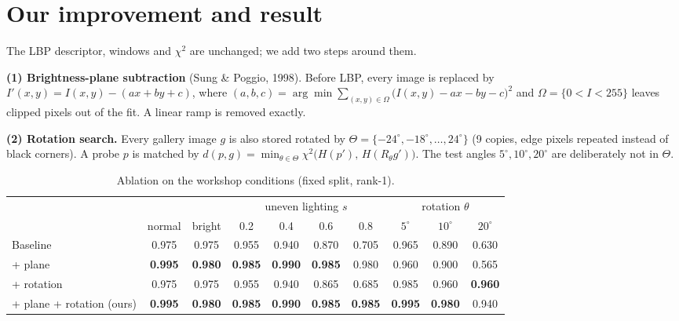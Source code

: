 \documentclass{article}
\begin{document}
\section{Our improvement and result}

The LBP descriptor, windows and $\chi^2$ are unchanged; we add two steps around them.

\textbf{(1) Brightness-plane subtraction} (Sung \& Poggio, 1998). Before LBP, every image
is replaced by $I'(x,y) = I(x,y) - (ax+by+c)$, where
$(a,b,c)=\arg\min \sum_{(x,y)\in\Omega}\big(I(x,y)-ax-by-c\big)^2$ and
$\Omega=\{0<I<255\}$ leaves clipped pixels out of the fit. A linear ramp is removed exactly.

\textbf{(2) Rotation search.} Every gallery image $g$ is also stored rotated by
$\Theta=\{-24^\circ,-18^\circ,\dots,24^\circ\}$ (9 copies, edge pixels repeated instead of
black corners). A probe $p$ is matched by
$d(p,g)=\min_{\theta\in\Theta}\chi^2\big(H(p'),\,H(R_\theta g')\big)$.
The test angles $5^\circ, 10^\circ, 20^\circ$ are deliberately not in $\Theta$.

\begin{table}[H]
\centering\small
\begin{adjustbox}{max width=\linewidth}
\begin{tabular}{lccccccccc}
\toprule
 & & & \multicolumn{4}{c}{uneven lighting $s$} & \multicolumn{3}{c}{rotation $\theta$} \\
\cmidrule(lr){4-7}\cmidrule(lr){8-10}
 & normal & bright & 0.2 & 0.4 & 0.6 & 0.8 & $5^\circ$ & $10^\circ$ & $20^\circ$ \\
\midrule
Baseline         & 0.975 & 0.975 & 0.955 & 0.940 & 0.870 & 0.705 & 0.965 & 0.890 & 0.630 \\
+ plane          & \textbf{0.995} & \textbf{0.980} & \textbf{0.985} & \textbf{0.990} & \textbf{0.985} & 0.980 & 0.960 & 0.900 & 0.565 \\
+ rotation       & 0.975 & 0.975 & 0.955 & 0.940 & 0.865 & 0.685 & 0.985 & 0.960 & \textbf{0.960} \\
+ plane + rotation (ours) & \textbf{0.995} & \textbf{0.980} & \textbf{0.985} & \textbf{0.990} & \textbf{0.985} & \textbf{0.985} & \textbf{0.995} & \textbf{0.980} & 0.940 \\
\bottomrule
\end{tabular}
\end{adjustbox}
\caption{Ablation on the workshop conditions (fixed split, rank-1).}
\end{table}
\vspace{-0.6cm}
\end{document}
